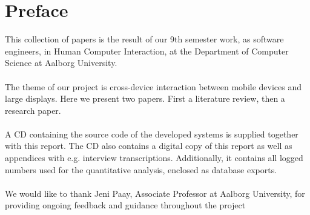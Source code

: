 \section*{Preface}
This collection of papers is the result of our 9th semester work, as software engineers, in Human Computer Interaction, at the Department of Computer Science at Aalborg University.\\\\
The theme of our project is cross-device interaction between mobile devices and large displays. Here we present two papers. First a literature review, then a research paper. \\\\
A CD containing the source code of the developed systems is supplied together with this report. The CD also contains a digital copy of this report as well as appendices with e.g. interview transcriptions. Additionally, it contains all logged numbers used for the quantitative analysis, enclosed as database exports. \\\\
We would like to thank Jeni Paay, Associate Professor at Aalborg University, for providing ongoing feedback and guidance throughout the project